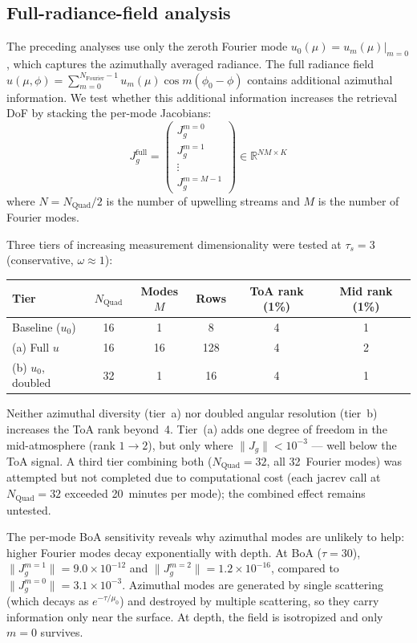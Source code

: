 \documentclass[11pt]{article}
\newcommand{\norm}[1]{\lVert #1 \rVert}
\begin{document}
\subsection{Full-radiance-field analysis}

The preceding analyses use only the zeroth Fourier mode
$u_0(\mu) = u_m(\mu)|_{m=0}$, which captures the azimuthally
averaged radiance.  The full radiance field
$u(\mu,\phi) = \sum_{m=0}^{N_\mathrm{Fourier}-1} u_m(\mu)\cos m(\phi_0-\phi)$
contains additional azimuthal information.  We test whether
this additional information increases the retrieval DoF by
stacking the per-mode Jacobians:
\[
  J_g^\mathrm{full} = \begin{pmatrix} J_g^{m=0} \\ J_g^{m=1} \\ \vdots \\ J_g^{m=M-1} \end{pmatrix}
  \in \mathbb{R}^{NM \times K}
\]
where $N = N_\mathrm{Quad}/2$ is the number of upwelling streams
and $M$ is the number of Fourier modes.

Three tiers of increasing measurement dimensionality were tested
at $\tau_s = 3$ (conservative, $\omega \approx 1$):

\begin{center}
\begin{tabular}{l c c c c c}
\toprule
Tier & $N_\mathrm{Quad}$ & Modes $M$ & Rows
  & ToA rank (1\%) & Mid rank (1\%)\\
\midrule
Baseline ($u_0$)  & 16 &  1 &   8 & 4 & 1\\
(a) Full $u$      & 16 & 16 & 128 & 4 & 2\\
(b) $u_0$, doubled& 32 &  1 &  16 & 4 & 1\\
\bottomrule
\end{tabular}
\end{center}

Neither azimuthal diversity (tier~a) nor doubled angular resolution
(tier~b) increases the ToA rank beyond~4.  Tier~(a) adds one degree
of freedom in the mid-atmosphere (rank $1\to 2$), but only where
$\norm{J_g} < 10^{-3}$ --- well below the ToA signal.
A third tier combining both ($N_\mathrm{Quad}=32$, all 32~Fourier
modes) was attempted but not completed due to computational cost
(each $\mathrm{jacrev}$ call at $N_\mathrm{Quad}=32$ exceeded
20~minutes per mode); the combined effect remains untested.

The per-mode BoA sensitivity reveals why azimuthal modes are
unlikely to help: higher Fourier modes decay exponentially with
depth.  At BoA ($\tau = 30$), $\norm{J_g^{m=1}} =
9.0\times10^{-12}$ and $\norm{J_g^{m=2}} = 1.2\times10^{-16}$, compared
to $\norm{J_g^{m=0}} = 3.1\times10^{-3}$.  Azimuthal modes are generated
by single scattering (which decays as $e^{-\tau/\mu_0}$) and destroyed
by multiple scattering, so they carry information only near the surface.
At depth, the field is isotropized and only $m=0$ survives.
\end{document}
